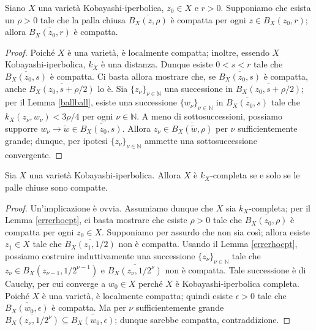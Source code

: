 \begin{lm} \label{errerhocpt}
    Siano $X$ una varietà Kobayashi-iperbolica, $z_0\in X$ e $r>0$. Supponiamo che esista un $\rho>0$ tale che la palla chiusa $\overline{B_X(z,\rho)}$ è compatta per ogni $z\in B_X(z_0,r)$; allora $\overline{B_X(z_0,r)}$ è compatta.
\end{lm}

\begin{proof}
    Poiché $X$ è una varietà, è localmente compatta; inoltre, essendo $X$ Kobayashi-iperbolica, $k_X$ è una distanza. Dunque esiste $0<s<r$ tale che $\overline{B_X(z_0,s)}$ è compatta. Ci basta allora mostrare che, se $\overline{B_X(z_0,s)}$ è compatta, anche $\overline{B_X(z_0,s+\rho/2)}$ lo è. Sia $\{z_\nu\}_{\nu\in\mathbb{N}}$ una successione in $\overline{B_X(z_0,s+\rho/2)}$; per il Lemma \ref{ballball}, esiste una successione $\{w_\nu\}_{\nu\in\mathbb{N}}$ in $\overline{B_X(z_0,s)}$ tale che $k_X(z_\nu,w_\nu)<3\rho/4$ per ogni $\nu\in\mathbb{N}$. A meno di sottosuccessioni, possiamo supporre $w_\nu\longrightarrow \tilde{w}\in\overline{B_X(z_0,s)}$. Allora $z_\nu\in\overline{B_X(\tilde{w},\rho)}$ per $\nu$ sufficientemente grande; dunque, per ipotesi $\{z_\nu\}_{\nu\in\mathbb{N}}$ ammette una sottosuccessione convergente.
\end{proof}

\begin{lm} \label{comp_is_comp}
    Sia $X$ una varietà Kobayashi-iperbolica. Allora $X$ è $k_X$-completa se e solo se le palle chiuse sono compatte.
\end{lm}

\begin{proof}
    Un'implicazione è ovvia. Assumiamo dunque che $X$ sia $k_X$-completa; per il Lemma \ref{errerhocpt}, ci basta mostrare che esiste $\rho>0$ tale che $\overline{B_X(z_0,\rho)}$ è compatta per ogni $z_0\in X$. Supponiamo per assurdo che non sia così; allora esiste $z_1\in X$ tale che $\overline{B_X(z_1,1/2)}$ non è compatta. Usando il Lemma \ref{errerhocpt}, possiamo costruire induttivamente una successione $\{z_\nu\}_{\nu\in\mathbb{N}}$ tale che ${z_\nu\in B_X(z_{\nu-1},1/2^{\nu-1})}$ e $\overline{B_X(z_\nu,1/2^\nu)}$ non è compatta. Tale successione è di Cauchy, per cui converge a $w_0\in X$ perché $X$ è Kobayashi-iperbolica completa. Poiché $X$ è una varietà, è localmente compatta; quindi esiste $\epsilon>0$ tale che $\overline{B_X(w_0,\epsilon)}$ è compatta. Ma per $\nu$ sufficientemente grande $\overline{B_X(z_\nu,1/2^\nu)}\subseteq\overline{B_X(w_0,\epsilon)}$; dunque sarebbe compatta, contraddizione.
\end{proof}

